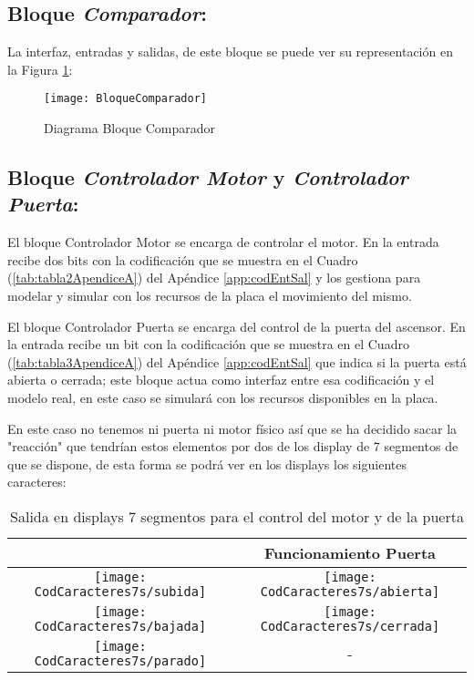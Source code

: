 \subsection{Bloque \textit{Comparador}:} \label{bloque:Comparador}

    La interfaz, entradas y salidas, de este bloque se puede ver su representación en la Figura \ref{fig:BloqueComparador}:
    
    \begin{figure}[H]
		    \centering
		    \texttt{[image: BloqueComparador]}
		    \caption{Diagrama Bloque Comparador}
		    \label{fig:BloqueComparador}
	\end{figure}



\subsection{Bloque \textit{Controlador Motor} y \textit{Controlador Puerta}:} \label{bloque:MotorPuerta}
    El bloque Controlador Motor se encarga de controlar el motor. En la entrada recibe dos bits con la codificación que se muestra en el Cuadro (\ref{tab:tabla2ApendiceA}) del Apéndice \ref{app:codEntSal} y los gestiona para modelar y simular con los recursos de la placa el movimiento del mismo.

    El bloque Controlador Puerta se encarga del control de la puerta del ascensor. En la entrada recibe un bit con la codificación que se muestra en el Cuadro (\ref{tab:tabla3ApendiceA}) del Apéndice \ref{app:codEntSal} que indica si la puerta está abierta o cerrada; este bloque actua como interfaz entre esa codificación y el modelo real, en este caso se simulará con los recursos disponibles en la placa.

    En este caso no tenemos ni puerta ni motor físico así que se ha decidido sacar la "reacción" que tendrían estos elementos por dos de los display de 7 segmentos de que se dispone, de esta forma se podrá ver en los displays los siguientes caracteres:

	\begin{table}[H]
        \centering
			\begin{tabular}{|c|c|}
				\hline
				\rowcolor[rgb]{0.21,0.69,0.87}\multicolumn{1}{|c|}{  \textbf{ {Funcionamiento Motor}}} & \multicolumn{1}{|c|}{  \textbf{ {Funcionamiento Puerta}}} \\
				\hline \hline
				\hline
				 \texttt{[image: CodCaracteres7s/subida]} &  \texttt{[image: CodCaracteres7s/abierta]}  \\
				\hline
				 \texttt{[image: CodCaracteres7s/bajada]} &  \texttt{[image: CodCaracteres7s/cerrada]}  \\
				\hline
				 \texttt{[image: CodCaracteres7s/parado]} &  - \\
				\hline				 
			\end{tabular}
			\caption{ Salida en displays 7 segmentos para el control del motor y de la puerta }
			\label{tab:tablaVisualizacionMotorPuerta}
	\end{table}
    
	
